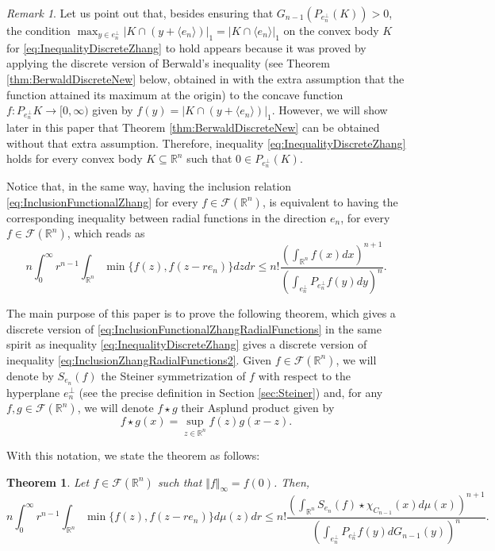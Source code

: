 \documentclass{amsart}
\newcommand{\R}{\mathbb R}
\newtheorem{thm}{Theorem}[section]
\theoremstyle{remark}
\newtheorem{rmk}{Remark}
\theoremstyle{definition}
\numberwithin{equation}{section}
\begin{document}
\begin{rmk}
Let us point out that, besides ensuring that $G_{n-1}(P_{e_n^\perp}(K))>0$, the condition $\displaystyle{\max_{y\in e_n^\perp}|K\cap (y+\langle e_n\rangle)|_1=|K\cap \langle e_n\rangle|_1}$  on the convex body $K$ for \eqref{eq:InequalityDiscreteZhang} to hold appears because it was proved by applying the discrete version of Berwald's inequality (see Theorem \ref{thm:BerwaldDiscreteNew} below, obtained in \cite[Thm. 4.5]{ALY} with the extra assumption that the function attained its maximum at the origin) to the concave function $f: P_{e_n^\perp}K\to[0,\infty)$ given by $f(y)=|K\cap (y+\langle e_n\rangle)|_1$. However, we will show later in this paper that Theorem \ref{thm:BerwaldDiscreteNew} can be obtained without that extra assumption. Therefore, inequality \eqref{eq:InequalityDiscreteZhang} holds for every convex body $K\subseteq\R^n$ such that $0\in P_{e_n^\perp}(K)$.
\end{rmk}

Notice that, in the same way, having the inclusion relation \eqref{eq:InclusionFunctionalZhang} for every $f\in\mathcal{F}(\R^n)$, is equivalent to having the corresponding inequality between radial functions in the direction $e_n$, for every $f\in\mathcal{F}(\R^n)$, which reads as
\begin{equation}\label{eq:InclusionFunctionalZhangRadialFunctions}
n\int_0^\infty r^{n-1}\int_{\R^n}\min\{f(z),f(z-re_n)\}dzdr\leq n!\frac{\left(\int_{\R^n}f(x)dx\right)^{n+1}}{\left(\int_{e_n^\perp}P_{e_n^\perp}f(y)dy\right)^n}.
\end{equation}

The main purpose of this paper is to prove the following theorem, which gives a discrete version of \eqref{eq:InclusionFunctionalZhangRadialFunctions} in the same spirit as inequality \eqref{eq:InequalityDiscreteZhang} gives a discrete version of inequality \eqref{eq:InclusionZhangRadialFunctions2}. Given $f\in\mathcal{F}(\R^n)$, we will denote by $S_{e_n}(f)$ the Steiner symmetrization of $f$ with respect to the hyperplane $e_n^\perp$ (see the precise definition in Section \ref{sec:Steiner}) and, for any  $f,g\in\mathcal{F}(\R^n)$, we will denote $f\star g$ their Asplund product given by
$$
f\star g(x)=\sup_{z\in\R^n}f(z)g(x-z).
$$

With this notation, we state the theorem as follows:

\begin{thm}\label{thm:DiscreteFunctionalZhang}
Let $f\in\mathcal{F}(\R^n)$ such that $\Vert f\Vert_\infty=f(0)$. Then,
$$
n\int_0^\infty r^{n-1}\int_{\R^n}\min\{f(z),f(z-re_n)\}d\mu(z)dr\leq n!\frac{\left(\int_{\R^n}S_{e_n}(f)\star\chi_{C_{n-1}}(x)d\mu(x)\right)^{n+1}}{\left(\int_{e_n^\perp}P_{e_n^\perp}f(y)dG_{n-1}(y)\right)^n}.
$$
\end{thm}
\end{document}
